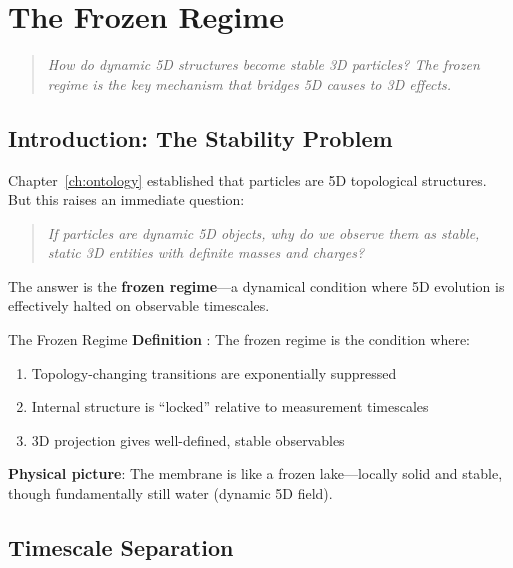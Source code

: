 \chapter{The Frozen Regime}
\label{ch:frozen}

\begin{quote}
\textit{How do dynamic 5D structures become stable 3D particles?
The frozen regime is the key mechanism that bridges 5D causes to 3D effects.}
\end{quote}

\section{Introduction: The Stability Problem}
\label{sec:frozen_intro}

Chapter~\ref{ch:ontology} established that particles are 5D topological
structures. But this raises an immediate question:

\begin{quote}
\textit{If particles are dynamic 5D objects, why do we observe them as
stable, static 3D entities with definite masses and charges?}
\end{quote}

The answer is the \textbf{frozen regime}---a dynamical condition where
5D evolution is effectively halted on observable timescales.

\begin{statusbox}{The Frozen Regime}
\textbf{Definition} \tagP{}: The frozen regime is the condition where:
\begin{enumerate}[nosep]
\item Topology-changing transitions are exponentially suppressed
\item Internal structure is ``locked'' relative to measurement timescales
\item 3D projection gives well-defined, stable observables
\end{enumerate}

\textbf{Physical picture}: The membrane is like a frozen lake---locally
solid and stable, though fundamentally still water (dynamic 5D field).
\end{statusbox}

\section{Timescale Separation}
\label{sec:timescale_separation}

